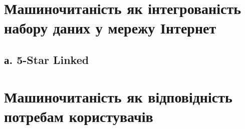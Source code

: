 \documentclass[
]{agujournal2019}
\begin{document}
\section{Машиночитаність як інтегрованість набору даних у мережу
Інтернет}\label{ux43cux430ux448ux438ux43dux43eux447ux438ux442ux430ux43dux456ux441ux442ux44c-ux44fux43a-ux456ux43dux442ux435ux433ux440ux43eux432ux430ux43dux456ux441ux442ux44c-ux43dux430ux431ux43eux440ux443-ux434ux430ux43dux438ux445-ux443-ux43cux435ux440ux435ux436ux443-ux456ux43dux442ux435ux440ux43dux435ux442}

\subsection{а. 5-Star Linked}\label{ux430.-5-star-linked}

\section{Машиночитаність як відповідність потребам
користувачів}\label{sec-data-methods}
\end{document}
